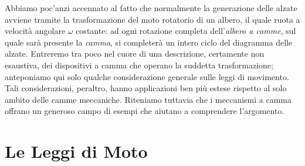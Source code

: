 Abbiamo poc'anzi accennato al fatto che normalmente 
la generazione delle alzate avviene tramite la trasformazione del moto
rotatorio di un albero, il quale ruota
a velocit\`a angolare  $\omega$ costante: ad ogni rotazione
completa dell'{\em albero a camme},
sul quale sar\`a presente la {\em camma}, si completer\`a un intero ciclo del diagramma delle alzate.
Entreremo tra poco nel cuore di una 
descrizione, certamente non esaustiva, dei dispositivi a camma che operano la suddetta trasformazione;
anteponiamo qui solo qualche considerazione generale sulle leggi di movimento.
Tali considerazioni, peraltro, hanno applicazioni ben pi\`u estese rispetto al solo ambito delle camme meccaniche.
Riteniamo tuttavia che i meccanismi a camma offrano un generoso campo di
esempi che aiutano a comprendere l'argomento.

\section{Le Leggi di Moto}

